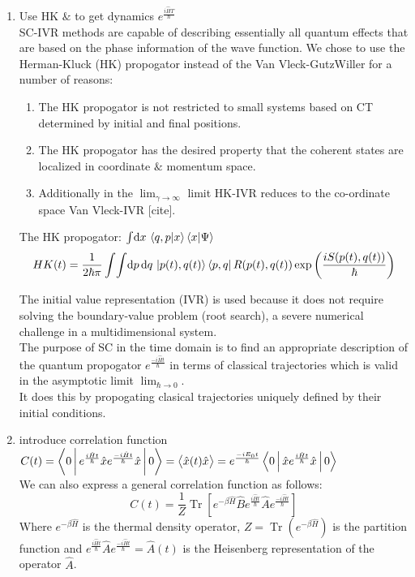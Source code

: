 \documentclass[12pt,letterpaper,oneside,final,titlepage]{article}               %
\numberwithin{equation}{section} %
\DeclareMathOperator{\Tr}{Tr}
\begin{document}
\begin{enumerate}
	\item Use HK $\&$ to get dynamics $e^{\frac{i\hat{H}T}{\hbar}}$ \\
	SC-IVR methods are capable of describing essentially all quantum effects that are based on the phase information of the wave function.
	We chose to use the Herman-Kluck (HK) propogator instead of the Van Vleck-GutzWiller for a number of reasons:
	\begin{enumerate}
		\item The HK propogator is not restricted to small systems based on CT determined by initial and final positions.
		\item The HK propogator has the desired property that the coherent states are localized in coordinate $\&$ momentum space.
		\item Additionally in the $\lim_{\gamma \to \infty}$ limit HK-IVR reduces to the co-ordinate space Van Vleck-IVR [cite]. 
	\end{enumerate}
	The HK propogator: $\int \!\dif x\, \braket{q, p | x}  \braket{x | \Psi} $
	\begin{equation}
		HK(t) = \frac{1}{2\hbar\pi}\int\!\int \!\dif p\,\!\dif q\, 
		\ket{p(t), q(t)}\bra{p,q} R(p(t),q(t))
		\exp{\left(\frac{iS(p(t),q(t))}{\hbar}\right)}
	\end{equation}

	The initial value representation (IVR) is used because it does not require solving the boundary-value problem (root search), a severe numerical challenge in a multidimensional system. \\
	The purpose of SC in the time domain is to find an appropriate description of the quantum propogator $e^{\frac{-i\hat{H}t}{\hbar}}$ 
	in terms of classical trajectories which is valid in the asymptotic limit $\lim_{\hbar \to 0}$. \\
	It does this by propogating clasical trajectories uniquely defined by their initial conditions.

	\item introduce correlation function $C(t) = \Braket{0|e^{\frac{i\hat{H}t}{\hbar}}\hat{x}e^{\frac{-i\hat{H}t}{\hbar}}\hat{x}|0} 
											   = \Braket{\hat{x}(t)\hat{x}} 
											   = e^{\frac{-iE_{0}t}{\hbar}}\Braket{0|\hat{x}e^{\frac{i\hat{H}t}{\hbar}}\hat{x}|0}$\\
	We can also express a general correlation function as follows:
	\begin{equation}
		C(t) = \frac{1}{Z}\Tr[e^{-\beta\hat{H}}\hat{B}e^{\frac{i\hat{H}t}{\hbar}}\hat{A}e^{\frac{-i\hat{H}t}{\hbar}}]
	\end{equation}
	Where $e^{-\beta\hat{H}}$ is the thermal density operator, $Z = \Tr(e^{-\beta\hat{H}})$ is the partition function and $e^{\frac{i\hat{H}t}{\hbar}}\hat{A}e^{\frac{-i\hat{H}t}{\hbar}}=\hat{A}(t)$ is the Heisenberg representation of the operator $\hat{A}$.


\end{enumerate}
\end{document}
